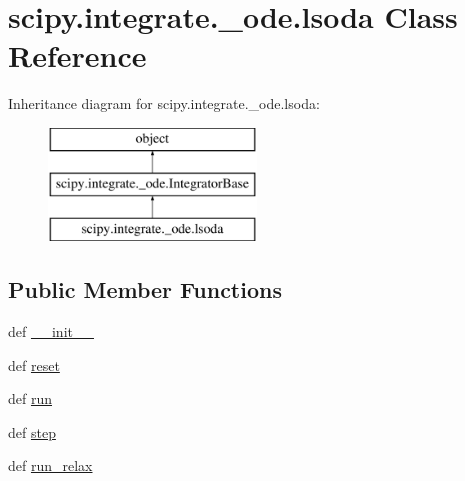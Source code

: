 \hypertarget{classscipy_1_1integrate_1_1__ode_1_1lsoda}{}\section{scipy.\+integrate.\+\_\+ode.\+lsoda Class Reference}
\label{classscipy_1_1integrate_1_1__ode_1_1lsoda}
Inheritance diagram for scipy.\+integrate.\+\_\+ode.\+lsoda\+:\begin{figure}[H]
\begin{center}
\leavevmode
\includegraphics[height=3.000000cm]{classscipy_1_1integrate_1_1__ode_1_1lsoda}
\end{center}
\end{figure}
\subsection*{Public Member Functions}
\begin{DoxyCompactItemize}
\item 
def \hyperlink{classscipy_1_1integrate_1_1__ode_1_1lsoda_ada5e51e9a561e8ee70b853315c5295a0}{\+\_\+\+\_\+init\+\_\+\+\_\+}
\item 
def \hyperlink{classscipy_1_1integrate_1_1__ode_1_1lsoda_a1a6d208e9f249f3a62dcc379270e4de1}{reset}
\item 
def \hyperlink{classscipy_1_1integrate_1_1__ode_1_1lsoda_acd2d9c33c582414972e3005a8ef096f3}{run}
\item 
def \hyperlink{classscipy_1_1integrate_1_1__ode_1_1lsoda_a52f30659ec367e2ebb6f310f277af2ac}{step}
\item 
def \hyperlink{classscipy_1_1integrate_1_1__ode_1_1lsoda_aaef5d6bf9c436e5ddb2a2b233509f6c9}{run\+\_\+relax}
\end{DoxyCompactItemize}
